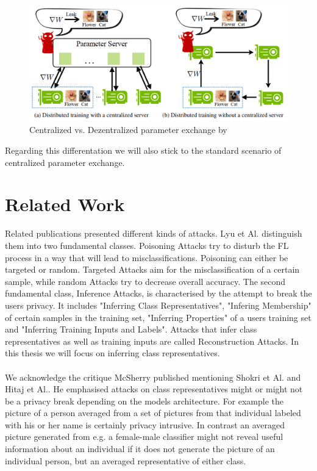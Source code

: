 \documentclass[
	ngerman,
	ruledheaders=section,%
	class=report,%
	thesis={type=bachelor},%
	accentcolor=1b,%
	custommargins=true,%
	marginpar=false,%
	parskip=half-,%
	fontsize=11pt,%
]{tudapub}
\begin{document}
\begin{figure}[H] 
  \centering
    \includegraphics[width=1\textwidth]{Figures/centralized_decentralized.PNG}
  \caption{Centralized vs. Dezentralized parameter exchange by \cite{zhu2019deep}}
  \label{fig:centralized_decentralized}
\end{figure}

Regarding this differentation we will also stick to the standard scenario of centralized parameter exchange. 




\chapter{Related Work}\label{sec:related_work}
Related publications presented different kinds of attacks. Lyu et Al.\cite{lyu2020threats} distinguish them into two fundamental classes. Poisoning Attacks try to disturb the FL process in a way that will lead to misclassifications. Poisoning can either be targeted or random. Targeted Attacks aim for the misclassification of a certain sample, while random Attacks try to decrease overall accuracy. The second fundamental class, Inference Attacks, is characterised by the attempt to break the users privacy. It includes "Inferring Class Representatives", "Infering Membership" of certain samples in the training set, "Inferring Properties" of a users training set and "Inferring Training Inputs and Labels". Attacks that infer class representatives as well as training inputs are called Reconstruction Attacks. In this thesis we will focus on inferring class representatives.\\
\\
We acknowledge the critique McSherry\cite{mcsherry2017} published mentioning Shokri et Al.\cite{shokri2015privacy} and Hitaj et Al.\cite{hitaj2017deep}. He emphasised attacks on class representatives might or might not be a privacy break depending on the models architecture. For example the picture of a person averaged from a set of pictures from that individual labeled with his or her name is certainly privacy intrusive. In contrast an averaged picture generated from e.g. a female-male classifier might not reveal useful information about an individual if it does not generate the picture of an individual person, but an averaged representative of either class.
\end{document}
